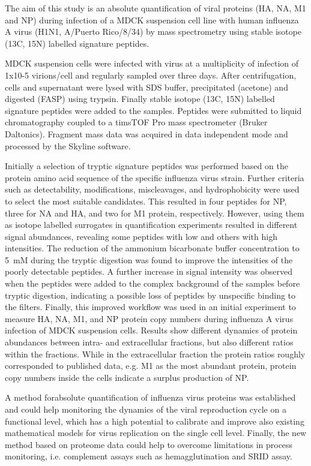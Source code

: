 {The aim of this study is an absolute quantification of viral proteins (HA, NA, M1 and NP) during infection of a MDCK suspension cell line with human influenza A virus (H1N1, A/Puerto Rico/8/34) by mass spectrometry using stable isotope (13C, 15N) labelled signature peptides.

MDCK suspension cells were infected with virus at a multiplicity of infection of 1x10-5 virions/cell and regularly sampled over three days. After centrifugation, cells and supernatant were lysed with SDS buffer, precipitated (acetone) and digested (FASP) using trypsin. Finally stable isotope (13C, 15N) labelled signature peptides were added to the samples. Peptides were submitted to liquid chromatography coupled to a timsTOF Pro mass spectrometer (Bruker Daltonics). Fragment mass data was acquired in data independent mode and processed by the Skyline software.

Initially a selection of tryptic signature peptides was performed based on the protein amino acid sequence of the specific influenza virus strain. Further criteria such as detectability, modifications, miscleavages, and hydrophobicity were used to select the most suitable candidates. This resulted in four peptides for NP, three for NA and HA, and two for M1 protein, respectively. However, using them as isotope labelled surrogates in quantification experiments resulted in different signal abundances, revealing some peptides with low and others with high intensities. The reduction of the ammonium bicarbonate buffer concentration to 5 mM during the tryptic digestion was found to improve the intensities of the poorly detectable peptides. A further increase in signal intensity was observed when the peptides were added to the complex background of the samples before tryptic digestion, indicating a possible loss of peptides by unspecific binding to the filters. Finally, this improved workflow was used in an initial experiment to measure HA, NA, M1, and NP protein copy numbers during influenza A virus infection of MDCK suspension cells. Results show different dynamics of protein abundances between intra- and extracellular fractions, but also different ratios within the fractions. While in the extracellular fraction the protein ratios roughly corresponded to published data, e.g. M1 as the most abundant protein, protein copy numbers inside the cells indicate a surplus production of NP.

A method forabsolute quantification of influenza virus proteins was established and could help monitoring the dynamics of the viral reproduction cycle on a functional level, which has a high potential to calibrate and improve also existing mathematical models for virus replication on the single cell level. Finally, the new method based on proteome data could help to overcome limitations in process monitoring, i.e. complement assays such as hemagglutination and SRID assay.


}
